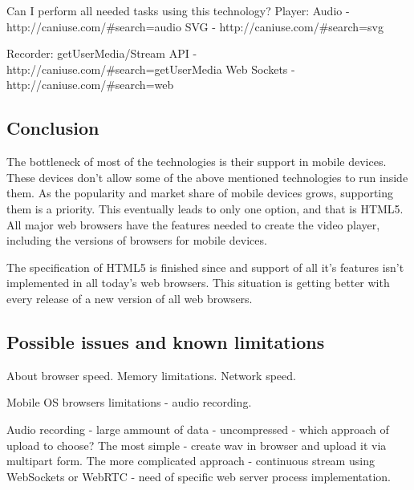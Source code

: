 Can I perform all needed tasks using this technology?
Player:
Audio - http://caniuse.com/#search=audio%
SVG - http://caniuse.com/#search=svg

Recorder: 
getUserMedia/Stream API - http://caniuse.com/#search=getUserMedia
Web Sockets - http://caniuse.com/#search=web%

\subsection{Conclusion}
The bottleneck of most of the technologies is their support in mobile devices. These devices don't allow some of the above mentioned technologies to run inside them. As the popularity and market share of mobile devices grows, supporting them is a priority. This eventually leads to only one option, and that is HTML5. All major web browsers have the features needed to create the video player, including the versions of browsers for mobile devices.

The specification of HTML5 is finished since  and support of all it's features isn't implemented in all today's web browsers. This situation is getting better with every release of a new version of all web browsers.




\subsection{Possible issues and known limitations}
About browser speed. Memory limitations. Network speed.

Mobile OS browsers limitations - audio recording.

Audio recording - large ammount of data - uncompressed - which approach of upload to choose? The most simple - create wav in browser and upload it via multipart form. The more complicated approach - continuous stream using WebSockets or WebRTC - need of specific web server process implementation.
